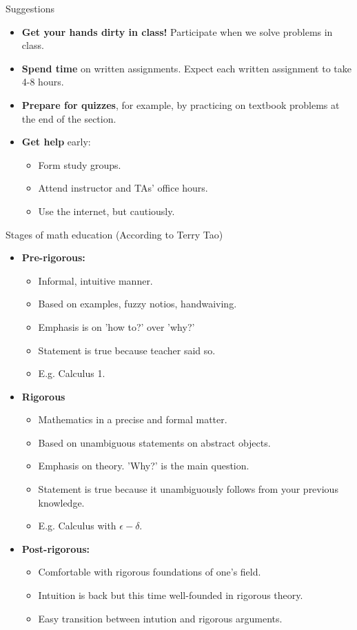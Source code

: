 \documentclass{beamer}
\begin{document}
\begin{frame}{Suggestions}
\begin{itemize}
\item \textbf{Get your hands dirty in class!}  Participate when we solve problems in class.\pause
\item \textbf{Spend time} on written assignments.  Expect each written assignment to take 4-8 hours.\pause
\item \textbf{Prepare for quizzes}, for example, by practicing on textbook problems at the end of the section.\pause
\item \textbf{Get help} early:
\begin{itemize}
\item Form study groups. \pause
\item Attend instructor and TAs' office hours. \pause
\item Use the internet, but cautiously.
\end{itemize}
\end{itemize}
\end{frame}

\begin{frame}{Stages of math education (According to Terry Tao)}
\begin{itemize}
\item<1-> \textbf{Pre-rigorous:}
\begin{itemize}
\item<2-> Informal, intuitive manner.
\item<3-> Based on examples, fuzzy notios, handwaiving.
\item<4-> Emphasis is on 'how to?' over 'why?'
\item<5-> Statement is true because teacher said so.
\item<6-> E.g. Calculus 1.
\end{itemize}
\item<1-> \textbf{Rigorous}
\begin{itemize}
\item<7-> Mathematics in a precise and formal matter.
\item<8-> Based on unambiguous statements on abstract objects.
\item<9-> Emphasis on theory. 'Why?' is the main question.
\item<10-> Statement is true because it unambiguously follows from your previous knowledge.
\item<11-> E.g. Calculus with $\epsilon-\delta$.
\end{itemize}
\item<1-> \textbf{Post-rigorous:}
\begin{itemize}
\item<12-> Comfortable with rigorous foundations of one's field.
\item<13-> Intuition is back but this time well-founded in rigorous theory.
\item<14-> Easy transition between intution and rigorous arguments.
\end{itemize}
\end{itemize}
\end{frame}
\end{document}
